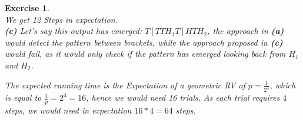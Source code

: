 \documentclass{article}
\newtheorem{exo}{Exercise}
\begin{document}
\begin{exo}{\ \\}
We get 12 Steps in expectation. \\ 

\noindent
\textbf{(c)} Let's say this output has emerged: $T[TTH_1T]HTH_2$, the approach in \textbf{(a)} would detect the pattern between brackets, while the approach proposed in \textbf{(c)} would fail, as it would only check if the pattern has emerged looking back from $H_1$ and $H_2$. 

The expected running time is the Expectation of a geometric RV of  $p = \frac{1}{2^4}$, which is equal to $\frac{1}{p}= 2^4 = 16 $, hence we would need 16 trials. As each trial requires $4$ steps, we would need in expectation $16*4 = 64$ steps.







\end{exo}
\end{document}
